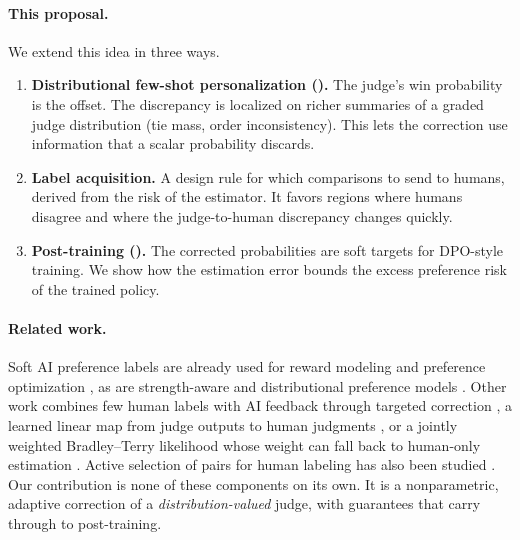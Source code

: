 \paragraph{This proposal.}
We extend this idea in three ways.
\begin{enumerate}
  \item \textbf{Distributional few-shot personalization (\dfsp).} The judge's win probability is the
        offset. The discrepancy is localized on richer summaries of a graded judge distribution
        (tie mass, order inconsistency). This lets the correction use information that a scalar
        probability discards.
  \item \textbf{Label acquisition.} A design rule for which comparisons to send to humans, derived
        from the risk of the estimator. It favors regions where humans disagree and where the
        judge-to-human discrepancy changes quickly.
  \item \textbf{Post-training (\fsppo).} The corrected probabilities are soft targets for DPO-style
        training. We show how the estimation error bounds the excess preference risk of the
        trained policy.
\end{enumerate}

\paragraph{Related work.}
Soft AI preference labels are already used for reward modeling and preference optimization
\citep{lee2024rlaif,furuta2024gapo}, as are strength-aware and distributional preference models
\citep{imai2026mixdpo,li2024dprm}. Other work combines few human labels with AI feedback through
targeted correction \citep{xu2025rlthf}, a learned linear map from judge outputs to human judgments
\citep{vandenburg2025aligning}, or a jointly weighted Bradley--Terry likelihood whose weight can fall
back to human-only estimation \citep{cai2026dial}. Active selection of pairs for human labeling has
also been studied \citep{shen2025active}. Our contribution is none of these components on its own.
It is a nonparametric, adaptive correction of a \emph{distribution-valued} judge, with guarantees
that carry through to post-training.
